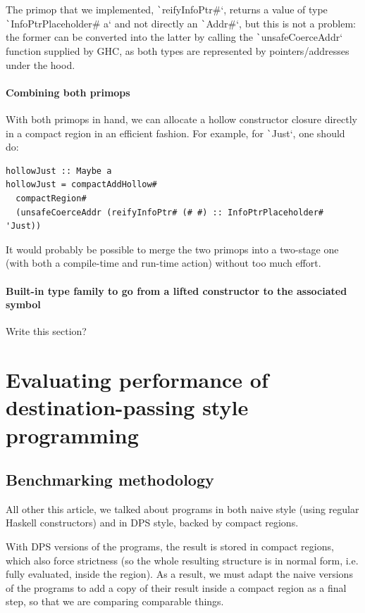 \documentclass[english]{jflart}
\newcommand{\TODO}[1]{{\color{red}\large #1}}
\begin{document}
The primop that we implemented, \texttt`reifyInfoPtr#`, returns a value of type \texttt`InfoPtrPlaceholder# a` and not directly an \texttt`Addr#`, but this is not a problem: the former can be converted into the latter by calling the \texttt`unsafeCoerceAddr` function supplied by GHC, as both types are represented by pointers/addresses under the hood.

\paragraph{Combining both primops}

With both primops in hand, we can allocate a hollow constructor closure directly in a compact region in an efficient fashion. For example, for \texttt`Just`, one should do:
{\small
\begin{verbatim}
hollowJust :: Maybe a
hollowJust = compactAddHollow#
  compactRegion#
  (unsafeCoerceAddr (reifyInfoPtr# (# #) :: InfoPtrPlaceholder# 'Just))  
\end{verbatim}
}

It would probably be possible to merge the two primops into a two-stage one (with both a compile-time and run-time action) without too much effort.

\paragraph{Built-in type family to go from a lifted constructor to the associated symbol}

\TODO{Write this section?}

\section{Evaluating performance of destination-passing style programming}\label{sec:benchmark}

\subsection{Benchmarking methodology}

All other this article, we talked about programs in both naive style (using regular Haskell constructors) and in DPS style, backed by compact regions.

With DPS versions of the programs, the result is stored in compact regions, which also force strictness (so the whole resulting structure is in normal form, i.e. fully evaluated, inside the region). As a result, we must adapt the naive versions of the programs to add a copy of their result inside a compact region as a final step, so that we are comparing comparable things.
\end{document}
